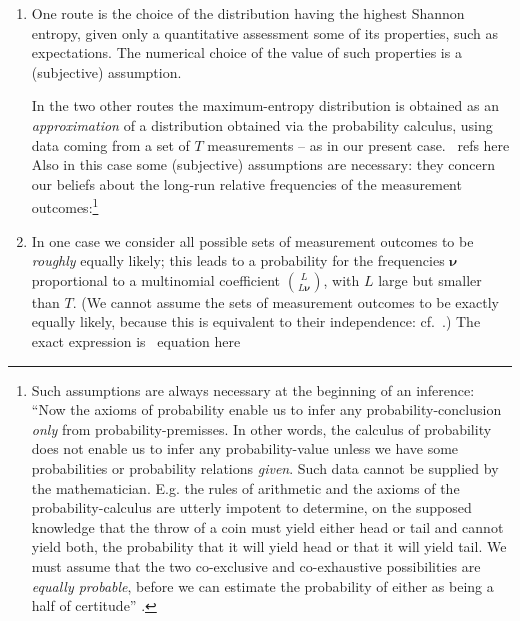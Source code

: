 \documentclass[\ifafour a4paper,12pt,\else a5paper,10pt,\fi%
onecolumn,oneside,article,%
british%
]{memoir}
\makeatletter
\theoremstyle{remark}
\theoremstyle{innote}
\def\sum{\DOTSI\sumop\slimits@}
\def\prod{\DOTSI\prodop\slimits@}
\newcommand*{\citep}{\parencites}
\newcommand*{\delt}{\deltaup}%
\newcommand*{\di}{\mathrm{d}}%
\newcommand*{\pf}{\mathrm{p}}%
\newcommand*{\p}{\mathrm{P}}%
\renewcommand*{\|}{\nonscript\,\vert\nonscript\;\mathopen{}}
\newcommand*{\sect}{\S}%
\newcommand*{\cf}{{cf.}}
\newcommand*{\tprod}{\mathop{\textstyle\prod}\nolimits}
\newcommand*{\tsum}{\mathop{\textstyle\sum}\nolimits}
\newcommand*{\puzzle}{{\fontencoding{U}\fontfamily{fontawesometwo}\selectfont\symbol{225}}}
\newcommand{\mynote}[1]{ {\color{notecolour}\puzzle\ #1}}
\newcommand*{\ynu}{\bm{\nu}}
\makeatother
\begin{document}
\begin{enumerate}[wide,label=(\alph*)]
\item \label{item:entropy_route}One route is the choice of the distribution having the highest
  Shannon entropy, given only a quantitative assessment some of its
  properties, such as expectations. The numerical choice of the value of
  such properties is a (subjective) assumption.

  \medskip

  In the two other routes the maximum-entropy distribution is obtained as
  an \emph{approximation} of a distribution obtained via the probability
  calculus, using data coming from a set of $T$ measurements -- as in our
  present case.\mynote{refs here} Also in this case some (subjective)
  assumptions are necessary: they concern our beliefs about the long-run
  relative frequencies of the measurement outcomes:\footnote{Such
    assumptions are always necessary at the beginning of an inference:
    \enquote{Now the axioms of probability enable us to infer any
      probability-conclusion \emph{only} from probability-premisses. In
      other words, the calculus of probability does not enable us to infer
      any probability-value unless we have some probabilities or
      probability relations \emph{given}. Such data cannot be supplied by
      the mathematician. E.g. the rules of arithmetic and the axioms of the
      probability-calculus are utterly impotent to determine, on the
      supposed knowledge that the throw of a coin must yield either head or
      tail and cannot yield both, the probability that it will yield head
      or that it will yield tail. We must assume that the two co-exclusive
      and co-exhaustive possibilities are \emph{equally probable}, before
      we can estimate the probability of either as being a half of
      certitude} \citep[\emph{Appendix on eduction}, \sect~5,
    p.~182]{johnson1924}.}

\item \label{item:entr_prior_route}In one case we consider all possible
  sets of measurement outcomes to be \emph{roughly} equally likely; this
  leads to a probability for the frequencies $\ynu$ proportional to a
  multinomial coefficient $\binom{L}{L\ynu}$, with $L$ large but smaller
  than $T$. (We cannot assume the sets of measurement outcomes to be
  exactly equally likely, because this is equivalent to their independence:
  \cf\
  \cites[\sect~6.7]{jaynes1994_r2003}[\sect~B]{portamana2009}[\sect~2]{portamana2017}.)
  The exact expression is\mynote{equation here}


\end{enumerate}
\end{document}
